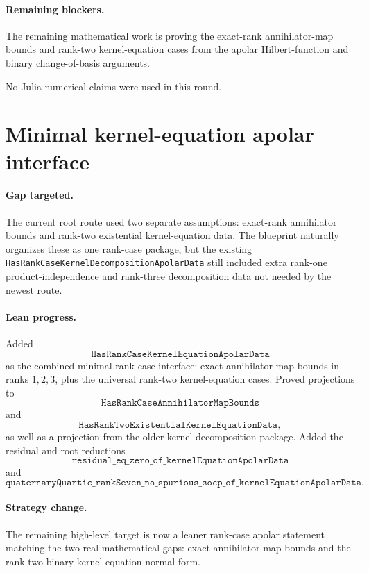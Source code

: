 \documentclass[11pt]{article}
\begin{document}
\paragraph{Remaining blockers.}
The remaining mathematical work is proving the exact-rank annihilator-map
bounds and rank-two kernel-equation cases from the apolar Hilbert-function and
binary change-of-basis arguments.

No Julia numerical claims were used in this round.

\section*{Minimal kernel-equation apolar interface}

\paragraph{Gap targeted.}
The current root route used two separate assumptions: exact-rank annihilator
bounds and rank-two existential kernel-equation data.  The blueprint naturally
organizes these as one rank-case package, but the existing
\texttt{HasRankCaseKernelDecompositionApolarData} still included extra
rank-one product-independence and rank-three decomposition data not needed by
the newest route.

\paragraph{Lean progress.}
Added
\[
\texttt{HasRankCaseKernelEquationApolarData}
\]
as the combined minimal rank-case interface: exact annihilator-map bounds in
ranks \(1,2,3\), plus the universal rank-two kernel-equation cases.  Proved
projections to
\[
\texttt{HasRankCaseAnnihilatorMapBounds}
\]
and
\[
\texttt{HasRankTwoExistentialKernelEquationData},
\]
as well as a projection from the older kernel-decomposition package.  Added
the residual and root reductions
\[
\texttt{residual\_eq\_zero\_of\_kernelEquationApolarData}
\]
and
\[
\texttt{quaternaryQuartic\_rankSeven\_no\_spurious\_socp\_of\_kernelEquationApolarData}.
\]

\paragraph{Strategy change.}
The remaining high-level target is now a leaner rank-case apolar statement
matching the two real mathematical gaps: exact annihilator-map bounds and the
rank-two binary kernel-equation normal form.
\end{document}
